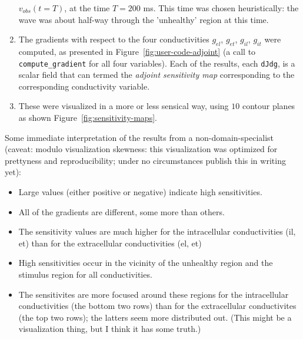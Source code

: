 \documentclass[a4paper, reqno]{amsart}
\numberwithin{equation}{section}
\begin{document}
\begin{enumerate}
    $v_{obs}(t = T)$, at the time $T = 200$ ms. This time was chosen
    heuristically: the wave was about half-way through the 'unhealthy'
    region at this time.
  \item
    The gradients with respect to the four conductivities $g_{el}$,
    $g_{et}$, $g_{il}$, $g_{it}$ were computed, as presented in
    Figure~\ref{fig:user-code-adjoint} (a call to
    \texttt{compute\_gradient} for all four variables). Each of the
    results, each \texttt{dJdg}, is a scalar field that can termed the
    \emph{adjoint sensitivity map} corresponding to the corresponding
    conductivity variable.
  \item
    These were visualized in a more or less sensical way, using $10$
    contour planes as shown Figure~\ref{fig:sensitivity-maps}.
\end{enumerate}

Some immediate interpretation of the results from a
non-domain-specialist (caveat: modulo visualization skewness: this
visualization was optimized for prettyness and reproducibility; under
no circumstances publish this in writing yet):
\begin{itemize}
\item
  Large values (either positive or negative) indicate high
  sensitivities.
\item
  All of the gradients are different, some more than others.
\item
  The sensitivity values are much higher for the intracellular
  conductivities (il, et) than for the extracellular
  conductivities (el, et)
\item
  High sensitivities occur in the vicinity of the unhealthy region
  and the stimulus region for all conductivities.
\item
  The sensitivites are more focused around these regions for the
  intracellular conductivities (the bottom two rows) than for the
  extracellular conductivites (the top two rows); the latters seem
  more distributed out. (This might be a visualization thing, but
  I think it has some truth.)
\end{itemize}
\end{document}
